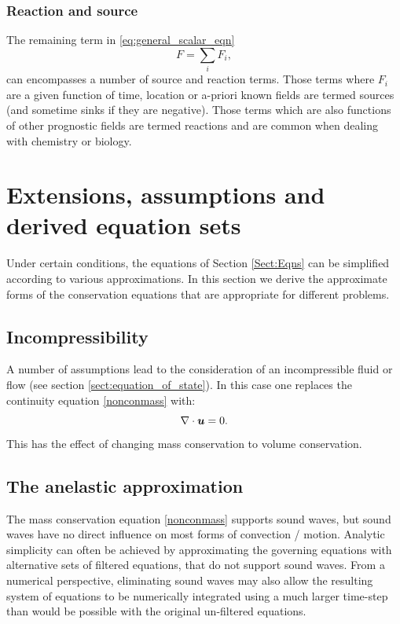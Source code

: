 \subsubsection{Reaction and source}
The remaining term in \eqref{eq:general_scalar_eqn}
\begin{equation}\label{eq:scalar_source}
F = \sum_i F_i,
\end{equation}
can encompasses a number of source and reaction terms. Those terms where $F_i$ are
a given function of time, location or a-priori known fields are termed sources (and sometime
sinks if they are negative). Those terms which are also functions of other prognostic fields
are termed reactions and are common when dealing with chemistry or biology.



\section{Extensions, assumptions and derived equation sets}\label{sect:eqn_extensions}
Under certain conditions, the equations of Section \ref{Sect:Eqns} can be simplified according to various approximations. In this section we derive the approximate forms of the conservation equations that are appropriate for different problems. 

\subsection{Incompressibility} \label{sect:incompressibility}
A number of assumptions lead to the consideration of an incompressible fluid or flow (see section \ref{sect:equation_of_state}). In this case one replaces the continuity equation \eqref{nonconmass} with:
\begin{equation}\label{eq:divfree}
\nabla\cdot{\mbox{\boldmath$u$}}=0.
\end{equation}
This has the effect of changing mass conservation to volume conservation.

\subsection{The anelastic approximation}
The mass conservation equation \eqref{nonconmass} supports sound waves, but sound waves have no direct influence on most forms of convection / motion. Analytic simplicity can often be achieved by approximating the governing equations with alternative sets of filtered equations, that do not support sound waves. From a numerical perspective, eliminating sound waves may also allow the resulting system of equations to be numerically integrated using a much larger time-step than would be possible with the original un-filtered equations. 

